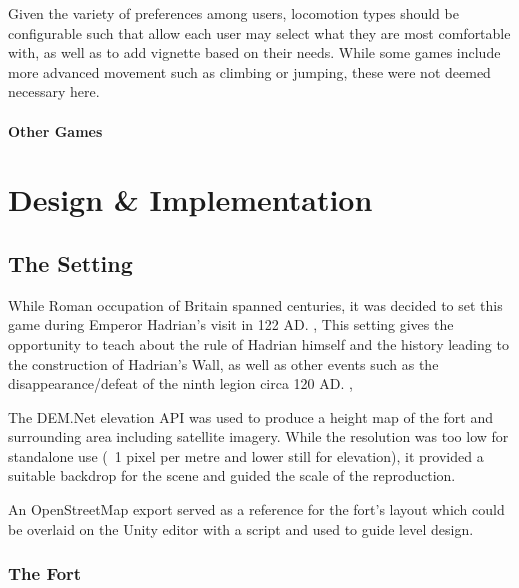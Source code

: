 \documentclass[sigconf,authordraft]{acmart}
\begin{document}
Given the variety of preferences among users, locomotion types should be
configurable such that allow each user may select what they are most comfortable
with, as well as to add vignette based on their needs. While some games include
more advanced movement such as climbing or jumping, these were not deemed
necessary here.



\paragraph{Other Games}

\section{Design \& Implementation}

\subsection{The Setting}

While Roman occupation of Britain spanned centuries, it was decided to set this
game during Emperor Hadrian's visit in 122 AD.
\cite[p.176]{danziger_hadrians_2006}, \cite[p.157]{moffat_wall_2009}
This setting gives the opportunity to teach about the rule of Hadrian himself
and the history leading to the construction of Hadrian's Wall, as well as other
events such as the disappearance/defeat of the ninth legion circa 120 AD.
\cite{rocha_romes_2021}, \cite{hodgson_end_2021}

The DEM.Net elevation API was used to produce a height map of the fort and
surrounding area including satellite imagery. While the resolution was too low
for standalone use (~1 pixel per metre and lower still for elevation), it
provided a suitable backdrop for the scene and guided the scale of the
reproduction.

An OpenStreetMap export served as a reference for the fort's layout which could
be overlaid on the Unity editor with a script and used to guide level design.


\subsubsection{The Fort}
\end{document}

